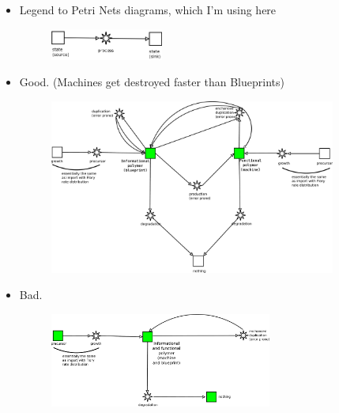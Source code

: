 \documentclass[12pt]{paper}
\begin{document}
\begin{itemize}
 \item Legend to Petri Nets diagrams, which I'm using here
\begin{figure}[h!]
 \centering
\includegraphics[width=0.35\textwidth]{pictures/legend.png}
\end{figure}
\item Good. (Machines get destroyed faster than Blueprints)
\begin{figure}[h!]
 \centering
\includegraphics[width=0.89\textwidth]{pictures/blueprint-machine.pdf}
\end{figure}

\item Bad. 
\begin{figure}[h!]
 \centering
\includegraphics[width=0.69\textwidth]{pictures/selfreplicating-machine.pdf}
\end{figure}
\end{itemize}

\newpage
\end{document}
